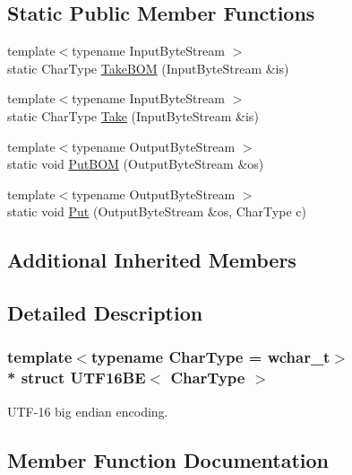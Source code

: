 \subsection*{Static Public Member Functions}
\begin{DoxyCompactItemize}
\item 
{\footnotesize template$<$typename Input\+Byte\+Stream $>$ }\\static Char\+Type \hyperlink{structUTF16BE_a5d5184a373149c69b4b8baf8507f9591}{Take\+B\+OM} (Input\+Byte\+Stream \&is)
\item 
{\footnotesize template$<$typename Input\+Byte\+Stream $>$ }\\static Char\+Type \hyperlink{structUTF16BE_a671ca76d54f45aa5f62eb86c4e69738a}{Take} (Input\+Byte\+Stream \&is)
\item 
{\footnotesize template$<$typename Output\+Byte\+Stream $>$ }\\static void \hyperlink{structUTF16BE_ae109dda1ad7955049589885ea5a13652}{Put\+B\+OM} (Output\+Byte\+Stream \&os)
\item 
{\footnotesize template$<$typename Output\+Byte\+Stream $>$ }\\static void \hyperlink{structUTF16BE_ab0f964c3ec9ac6cc47f2875ae112dbfe}{Put} (Output\+Byte\+Stream \&os, Char\+Type c)
\end{DoxyCompactItemize}
\subsection*{Additional Inherited Members}


\subsection{Detailed Description}
\subsubsection*{template$<$typename Char\+Type = wchar\+\_\+t$>$\\*
struct U\+T\+F16\+B\+E$<$ Char\+Type $>$}

U\+T\+F-\/16 big endian encoding. 

\subsection{Member Function Documentation}

